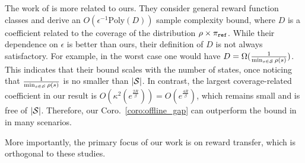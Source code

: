 The work of \citep{zhao2024sharp} is more related to ours. They consider general reward function classes and derive an $O(\epsilon^{-1} \text{Poly}(D))$ sample complexity bound, where $D$ is a coefficient related to the coverage of the distribution $\rho\times\pi_{\texttt{ref}}$.
While their dependence on $\epsilon$ is better than ours, their definition of $D$ is not always satisfactory. For example, in the worst case one would have $D = \Omega(\frac{1}{\min_{s\in\mathcal{S}}\rho(s)})$. This indicates that their bound scales with the number of states, once noticing that $\frac{1}{\min_{s\in\mathcal{S}}\rho(s)}$ is no smaller than $|\mathcal{S}|$.
In contrast, the largest coverage-related coefficient in our result is $O(\kappa^2(e^{\frac{2R}{\beta}})) = O(e^{\frac{4R}{\beta}})$, which remains small and is free of $|\mathcal{S}|$.
Therefore, our Coro.~\ref{coro:offline_gap} can outperform the bound in \citep{zhao2024sharp} in many scenarios.

More importantly, the primary focus of our work is on reward transfer, which is orthogonal to these studies.
%
%
